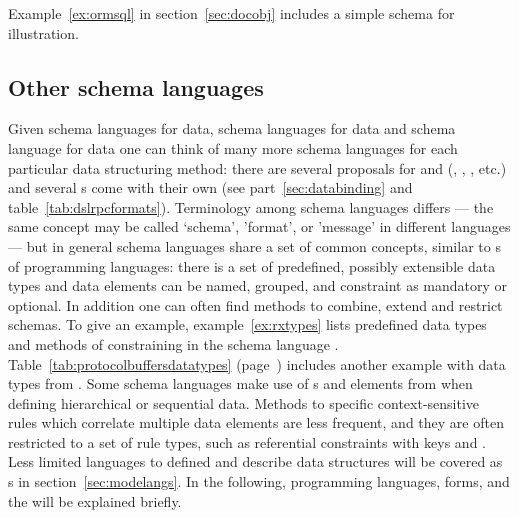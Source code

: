 Example~\ref{ex:ormsql} in section~\ref{sec:docobj} includes a simple
 schema for illustration.

\subsection{Other schema languages}
\label{sec:otherschemas}


Given  schema languages for  data,  schema
languages for  data and  schema language for 
data one can think of many more schema languages for each particular data
structuring method: there are several proposals for  and 
(, , ,  etc.) and several s come with their own
 (see part~\ref{sec:databinding} and
table~\ref{tab:dslrpcformats}). Terminology among schema languages differs ---
the same concept may be called `schema', 'format', or 'message' in different
languages --- but in general schema languages share a set of common concepts,
similar to s of programming languages: there is a set of
predefined, possibly extensible data types and data elements can be named,
grouped, and constraint as mandatory or optional. In addition one can often
find methods to combine, extend and restrict schemas.  To give an example,
example~\ref{ex:rxtypes} lists predefined data types and methods of
constraining in the  schema language \cite{Signes2008}.
Table~\ref{tab:protocolbuffersdatatypes}
(page~\pageref{tab:protocolbuffersdatatypes}) includes another example with
data types from .  Some schema languages make use of
s and elements from  when
defining hierarchical or sequential data.  Methods to specific
context-sensitive rules which correlate multiple data elements are less
frequent, and they are often restricted to a set of rule types, such as
referential constraints with keys and .  Less limited
languages to defined and describe data structures will be covered as
s in section~\ref{sec:modelangs}.  In the following,
programming languages, forms, and the  will be explained briefly.

